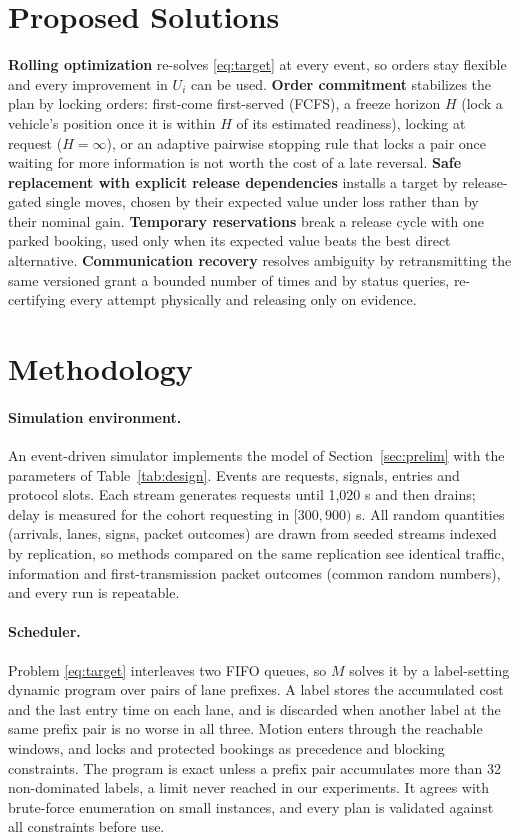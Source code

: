 \documentclass[10pt]{article}
\begin{document}
\section{Proposed Solutions}\label{sec:solutions}
\textbf{Rolling optimization} re-solves \eqref{eq:target} at every event, so orders stay flexible and every improvement in $U_i$ can be used.
\textbf{Order commitment} stabilizes the plan by locking orders: first-come first-served (FCFS), a freeze horizon $H$ (lock a vehicle's position once it is within $H$ of its estimated readiness), locking at request ($H=\infty$), or an adaptive pairwise stopping rule that locks a pair once waiting for more information is not worth the cost of a late reversal.
\textbf{Safe replacement with explicit release dependencies} installs a target by release-gated single moves, chosen by their expected value under loss rather than by their nominal gain.
\textbf{Temporary reservations} break a release cycle with one parked booking, used only when its expected value beats the best direct alternative.
\textbf{Communication recovery} resolves ambiguity by retransmitting the same versioned grant a bounded number of times and by status queries, re-certifying every attempt physically and releasing only on evidence.

\section{Methodology}\label{sec:method}
\paragraph{Simulation environment.} An event-driven simulator implements the model of Section~\ref{sec:prelim} with the parameters of Table~\ref{tab:design}. Events are requests, signals, entries and protocol slots. Each stream generates requests until 1,020 s and then drains; delay is measured for the cohort requesting in $[300,900)$ s. All random quantities (arrivals, lanes, signs, packet outcomes) are drawn from seeded streams indexed by replication, so methods compared on the same replication see identical traffic, information and first-transmission packet outcomes (common random numbers), and every run is repeatable.

\paragraph{Scheduler.} Problem \eqref{eq:target} interleaves two FIFO queues, so $M$ solves it by a label-setting dynamic program over pairs of lane prefixes. A label stores the accumulated cost and the last entry time on each lane, and is discarded when another label at the same prefix pair is no worse in all three. Motion enters through the reachable windows, and locks and protected bookings as precedence and blocking constraints. The program is exact unless a prefix pair accumulates more than 32 non-dominated labels, a limit never reached in our experiments. It agrees with brute-force enumeration on small instances, and every plan is validated against all constraints before use.
\end{document}
